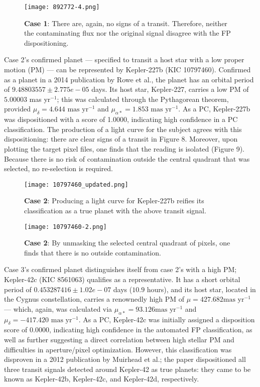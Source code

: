 \documentclass[onecolumn, 12pt]{article}
\begin{document}
\begin{figure}[p]
\centering
\texttt{[image: 892772-4.png]}
\caption{\textbf{Case 1}: There are, again, no signs of a transit. Therefore, neither the contaminating flux nor the original signal disagree with the FP dispositioning.}
\end{figure}

Case 2's confirmed planet — specified to transit a host star with a low proper motion (PM) — can be represented by Kepler-227b (KIC 10797460). Confirmed as a planet in a 2014 publication by Rowe et al., the planet has an orbital period of $9.48803557 \pm 2.775e-05$ days. Its host star, Kepler-227, carries a low PM of $5.00003$ mas yr$^{-1}$; this was calculated through the Pythagorean theorem, provided $\mu_{\delta}=4.644 \text{ mas yr}^{-1}$ and $\mu_{\alpha *}=1.853 \text{ mas yr}^{-1}$. As a PC, Kepler-227b was dispositioned with a score of 1.0000, indicating high confidence in a PC classification. The production of a light curve for the subject agrees with this dispositioning: there are clear signs of a transit in Figure 8. Moreover, upon plotting the target pixel files, one finds that the reading is isolated (Figure 9). Because there is no risk of contamination outside the central quadrant that was selected, no re-selection is required.

\begin{figure}[p]
\centering
\texttt{[image: 10797460\_updated.png]}
\caption{\textbf{Case 2}: Producing a light curve for Kepler-227b reifies its classification as a true planet with the above transit signal.}
\end{figure}

\begin{figure}[p]
\centering
\texttt{[image: 10797460-2.png]}
\caption{\textbf{Case 2}: By unmasking the selected central quadrant of pixels, one finds that there is no outside contamination.}
\end{figure}

Case 3's confirmed planet distinguishes itself from case 2's with a high PM; Kepler-42c (KIC 8561063) qualifies as a representative. It has a short orbital period of $0.453287416 \pm 1.02e-07$ days ($10.9$ hours), and its host star, located in the Cygnus constellation, carries a renownedly high PM of $\mu=427.682 \text {mas yr}^{-1}$ — which, again, was calculated via $\mu_{\alpha*}=93.126 \text {mas yr}^{-1}$ and $\mu_{\delta}=-417.420 \text { mas yr}^{-1}$. As a PC, Kepler-42c was initially assigned a disposition score of 0.0000, indicating high confidence in the automated FP classification, as well as further suggesting a direct correlation between high stellar PM and difficulties in aperture/pixel optimization. However, this classification was disproven in a 2012 publication by Muirhead et al.; the paper dispositioned all three transit signals detected around Kepler-42 as true planets: they came to be known as Kepler-42b, Kepler-42c, and Kepler-42d, respectively.
\end{document}
